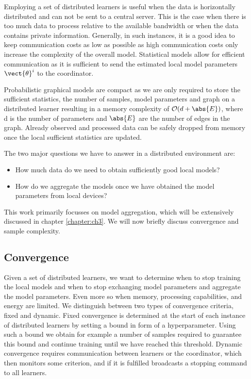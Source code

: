 Employing a set of distributed learners is useful when the data is horizontally distributed and can not be sent to a central server.
This is the case when there is too much data to process relative to the available bandwidth or when the data contains private information.
Generally, in such instances, it is a good idea to keep communication costs as low as possible as high communication costs only increase the complexity of the overall model.
Statistical models allow for efficient communication as it is sufficient to send the estimated local model parameters $\vect{\theta}^i$ to the coordinator. 

Probabilistic graphical models are compact as we are only required to store the sufficient statistics, the number of samples, model parameters and graph on a distributed learner resulting in a memory complexity of $\mathcal{O}(d + \abs{E})$, where d is the number of parameters and $\abs{E}$ are the number of edges in the graph. 
Already observed and processed data can be safely dropped from memory once the local sufficient statistics are updated.

The two major questions we have to answer in a distributed environment are:
\begin{itemize}
    \item How much data do we need to obtain sufficiently good local models?
    \item How do we aggregate the models once we have obtained the model parameters from local devices?
\end{itemize}

This work primarily focusses on model aggregation, which will be extensively discussed in chapter \ref{chapter:ch3}. 
We will now briefly discuss convergence and sample complexity.

\subsection{Convergence}
Given a set of distributed learners, we want to determine when to stop training the local models and when to stop exchanging model parameters and aggregate the model parameters.
Even more so when memory, processing capabilities, and energy are limited.
We distinguish between two types of convergence criteria, fixed and dynamic.
Fixed convergence is determined at the start of each instance of distributed learners by setting a bound in form of a hyperparameter.
Using such a bound we obtain for example a number of samples required to guarantee this bound and continue training until we have reached this threshold.
Dynamic convergence requires communication between learners or the coordinator, which then monitors some criterion, and if it is fulfilled broadcasts a stopping command to all learners. 

